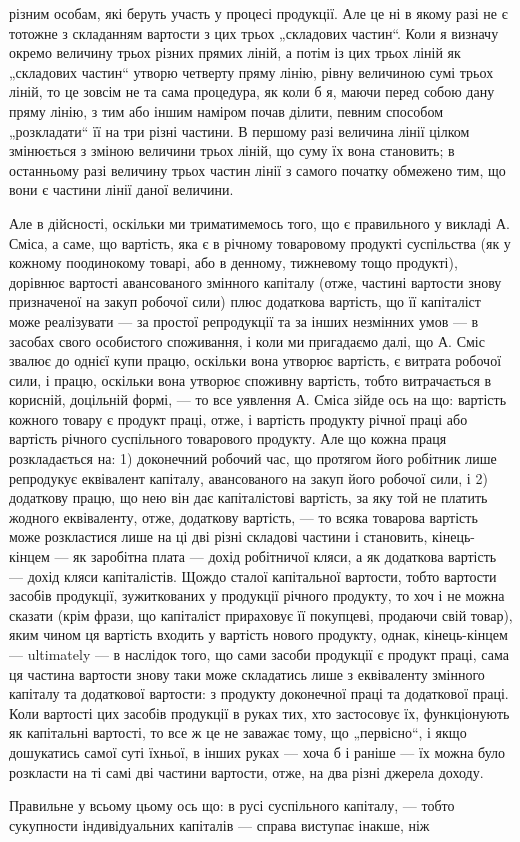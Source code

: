 \parcont{}  %
різним особам, які беруть участь у процесі продукції. Але це ні в якому
разі не є тотожне з складанням вартости з цих трьох „складових частин“.
Коли я визначу окремо величину трьох різних прямих ліній, а
потім із цих трьох ліній як „складових частин“ утворю четверту пряму
лінію, рівну величиною сумі трьох ліній, то це зовсім не та сама процедура,
як коли б я, маючи перед собою дану пряму лінію, з тим або
іншим наміром почав ділити, певним способом „розкладати“ її на три
різні частини. В першому разі величина лінії цілком змінюється з зміною
величини трьох ліній, що суму їх вона становить; в останньому разі
величину трьох частин лінії з самого початку обмежено тим, що вони
є частини лінії даної величини.

Але в дійсності, оскільки ми триматимемось того, що є правильного
у викладі А. Сміса, а саме, що  вартість,
яка є в річному товаровому продукті суспільства (як у кожному поодинокому
товарі, або в денному, тижневому тощо продукті), дорівнює вартості
авансованого змінного капіталу (отже, частині вартости знову призначеної
на закуп робочої сили) плюс додаткова вартість, що її капіталіст може
реалізувати — за простої репродукції та за інших незмінних умов — в засобах
свого особистого споживання, і коли ми пригадаємо далі, що А.
Сміс звалює до однієї купи працю, оскільки вона утворює вартість, є
витрата робочої сили, і працю, оскільки вона утворює споживну вартість,
тобто витрачається в корисній, доцільній формі, — то все уявлення
А. Сміса зійде ось на що: вартість кожного товару є продукт праці,
отже, і вартість продукту річної праці або вартість річного суспільного
товарового продукту. Але що кожна праця розкладається на: 1) доконечний
робочий час, що протягом його робітник лише репродукує еквівалент
капіталу, авансованого на закуп його робочої сили, і 2) додаткову працю,
що нею він дає капіталістові вартість, за яку той не платить жодного
еквіваленту, отже, додаткову вартість, — то всяка товарова вартість може
розкластися лише на ці дві різні складові частини і становить, кінець-кінцем —
як заробітна плата — дохід робітничої кляси, а як додаткова вартість —
дохід кляси капіталістів. Щождо сталої капітальної вартости, тобто вартости
засобів продукції, зужиткованих у продукції річного продукту, то
хоч і не можна сказати (крім фрази, що капіталіст прираховує її покупцеві,
продаючи свій товар), яким чином ця вартість входить у вартість
нового продукту, однак, кінець-кінцем — ultimately — в наслідок того, що
сами засоби продукції є продукт праці, сама ця частина вартости знову
таки може складатись лише з еквіваленту змінного капіталу та додаткової
вартости: з продукту доконечної праці та додаткової праці. Коли
вартості цих засобів продукції в руках тих, хто застосовує їх, функціонують
як капітальні вартості, то все ж це не заважає тому, що „первісно“,
і якщо дошукатись самої суті їхньої, в інших руках — хоча б і раніше — їх
можна було розкласти на ті самі дві частини вартости, отже, на два
різні джерела доходу.

Правильне у всьому цьому ось що: в русі суспільного капіталу, —
тобто сукупности індивідуальних капіталів — справа виступає інакше, ніж
\parbreak{}  %
